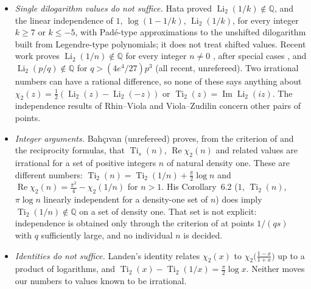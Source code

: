 \documentclass[11pt]{amsart}
\theoremstyle{definition}
\theoremstyle{remark}
\numberwithin{equation}{section}
\newcommand{\QQ}{\mathbb{Q}}
\newcommand{\Li}{\operatorname{Li}}
\newcommand{\Ti}{\operatorname{Ti}}
\begin{document}
\begin{itemize}
  $\Ti_2(1/q)\notin\QQ$ for all sufficiently large $q$, by \eqref{eq:lerch}. We do not know its threshold for the shift
  $\frac12$, at either sign of $Q$. A heuristic reconstruction of what we take to be Hata's construction at shift
  $\frac12$ and $Q=q^2$ (calibrated so that it reproduces his unshifted constant $11.837\ldots$) suggests a threshold
  near $q\approx55$--$85$ for $\chi_2(1/q)$; this is an estimate, not a statement about his paper, and it says nothing
  about $Q=-q^2$, where his unshifted thresholds are better. The point $4/q^2$ of $\chi_2(2/q)$ is not of the form
  $1/Q$, so Theorem~\ref{thm:C} lies outside the theorem as it is reviewed.
\item \emph{Single dilogarithm values do not suffice.} Hata \cite[Thm.~1.1]{Hata1993} proved $\Li_2(1/k)\notin\QQ$,
  and the linear independence of $1$, $\log(1-1/k)$, $\Li_2(1/k)$, for every integer $k\ge7$ or $k\le-5$, with
  Pad\'e-type approximations to the unshifted dilogarithm built from Legendre-type polynomials; it does not treat
  shifted values. Recent work proves
  $\Li_2(1/n)\notin\QQ$ for every integer $n\ne0$ \cite{Zhang2026}, after special cases \cite{TangLi2,Prellberg2026,LiuLi2},
  and $\Li_2(p/q)\notin\QQ$ for $q>(4e^4/27)p^3$ \cite{TanZhang2026}
  (all recent, unrefereed). Two irrational numbers can have a rational difference, so none of these says anything
  about $\chi_2(z)=\frac12(\Li_2(z)-\Li_2(-z))$ or $\Ti_2(z)=\operatorname{Im}\Li_2(iz)$. The independence results of
  Rhin--Viola \cite{RhinViola2005} and Viola--Zudilin \cite{ViolaZudilin2018} concern other pairs of points.
\item \emph{Integer arguments.} Bah\c{c}{\i}van \cite{Bahcivan2026} (unrefereed) proves, from the criterion of
  \cite{DHK2022} and the reciprocity formulas, that $\Ti_s(n)$, $\operatorname{Re}\chi_2(n)$ and related values are
  irrational for a set of positive integers $n$ of natural density one. These are different numbers:
  $\Ti_2(n)=\Ti_2(1/n)+\frac\pi2\log n$ and $\operatorname{Re}\chi_2(n)=\frac{\pi^2}4-\chi_2(1/n)$ for $n>1$. His
  Corollary~6.2 ($1$, $\Ti_2(n)$, $\pi\log n$ linearly independent for a density-one set of $n$) does imply
  $\Ti_2(1/n)\notin\QQ$ on a set of density one. That set is not explicit: independence is obtained only through the
  criterion of \cite{DHK2022} at points $1/(qs)$ with $q$ sufficiently large, and no individual $n$ is decided.
\item \emph{Identities do not suffice.} Landen's identity \cite[App.~A.2.1, (24)]{Lewin1981} relates $\chi_2(x)$ to
  $\chi_2\bigl(\frac{1-x}{1+x}\bigr)$ up to a product of logarithms, and $\Ti_2(x)-\Ti_2(1/x)=\frac\pi2\log x$. Neither
  moves our numbers to values known to be irrational.
\end{itemize}
\end{document}
